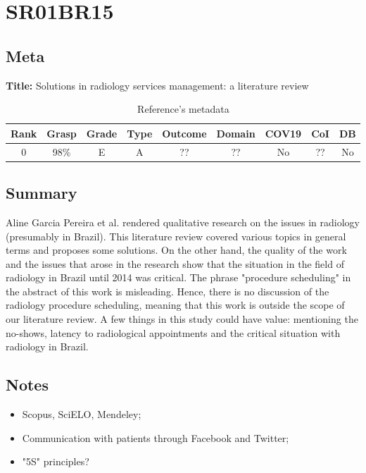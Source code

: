\section{ SR01BR15 }


\subsection{Meta}

    \textbf{Title:}
    Solutions in radiology services management: a literature review

    \begin{table}[H]
        \centering
        \begin{tabular}{|c|c|c|c|c|c|c|c|c|}
            \hline
                \textbf{Rank} & \textbf{Grasp} & \textbf{Grade} & \textbf{Type} & \textbf{Outcome} & \textbf{Domain} & \textbf{COV19} & \textbf{CoI} & \textbf{DB} \\
            \hline
                0 & 98\% & E & A & ?? & ?? & No & ?? & No \\
            \hline
        \end{tabular}
        \caption{Reference's metadata}
        \label{tab:SR01BR15}
    \end{table}

\subsection{Summary}
    Aline Garcia Pereira et al. \cite{x073} rendered qualitative research on the issues in radiology (presumably in Brazil). This literature review covered various topics in general terms and proposes some solutions. On the other hand, the quality of the work and the issues that arose in the research show that the situation in the field of radiology in Brazil until 2014 was critical. The phrase "procedure scheduling" in the abstract of this work is misleading. Hence, there is no discussion of the radiology procedure scheduling, meaning that this work is outside the scope of our literature review. A few things in this study could have value: mentioning the no-shows, latency to radiological appointments and the critical situation with radiology in Brazil. 

\subsection{Notes}
    \begin{itemize}
        \item Scopus, SciELO, Mendeley;
        \item Communication with patients through Facebook and Twitter;
        \item "5S" principles?
    \end{itemize}


